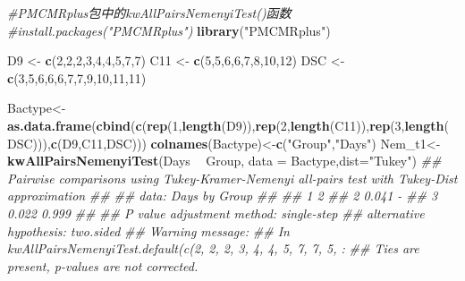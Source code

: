\documentclass[
]{article}
\newenvironment{Shaded}{\begin{snugshade}}{\end{snugshade}}
\newcommand{\CommentTok}[1]{\textcolor[rgb]{0.56,0.35,0.01}{\textit{#1}}}
\newcommand{\DataTypeTok}[1]{\textcolor[rgb]{0.13,0.29,0.53}{#1}}
\newcommand{\DecValTok}[1]{\textcolor[rgb]{0.00,0.00,0.81}{#1}}
\newcommand{\KeywordTok}[1]{\textcolor[rgb]{0.13,0.29,0.53}{\textbf{#1}}}
\newcommand{\NormalTok}[1]{#1}
\newcommand{\OperatorTok}[1]{\textcolor[rgb]{0.81,0.36,0.00}{\textbf{#1}}}
\newcommand{\StringTok}[1]{\textcolor[rgb]{0.31,0.60,0.02}{#1}}
\begin{document}
\begin{Shaded}
\begin{Highlighting}[]

\CommentTok{#PMCMRplus包中的kwAllPairsNemenyiTest()函数}
\CommentTok{#install.packages("PMCMRplus")}
\KeywordTok{library}\NormalTok{(}\StringTok{"PMCMRplus"}\NormalTok{)}

\NormalTok{D9 <-}\StringTok{ }\KeywordTok{c}\NormalTok{(}\DecValTok{2}\NormalTok{,}\DecValTok{2}\NormalTok{,}\DecValTok{2}\NormalTok{,}\DecValTok{3}\NormalTok{,}\DecValTok{4}\NormalTok{,}\DecValTok{4}\NormalTok{,}\DecValTok{5}\NormalTok{,}\DecValTok{7}\NormalTok{,}\DecValTok{7}\NormalTok{)}
\NormalTok{C11 <-}\StringTok{ }\KeywordTok{c}\NormalTok{(}\DecValTok{5}\NormalTok{,}\DecValTok{5}\NormalTok{,}\DecValTok{6}\NormalTok{,}\DecValTok{6}\NormalTok{,}\DecValTok{7}\NormalTok{,}\DecValTok{8}\NormalTok{,}\DecValTok{10}\NormalTok{,}\DecValTok{12}\NormalTok{)}
\NormalTok{DSC <-}\StringTok{ }\KeywordTok{c}\NormalTok{(}\DecValTok{3}\NormalTok{,}\DecValTok{5}\NormalTok{,}\DecValTok{6}\NormalTok{,}\DecValTok{6}\NormalTok{,}\DecValTok{6}\NormalTok{,}\DecValTok{7}\NormalTok{,}\DecValTok{7}\NormalTok{,}\DecValTok{9}\NormalTok{,}\DecValTok{10}\NormalTok{,}\DecValTok{11}\NormalTok{,}\DecValTok{11}\NormalTok{)}

\NormalTok{Bactype<-}\KeywordTok{as.data.frame}\NormalTok{(}\KeywordTok{cbind}\NormalTok{(}\KeywordTok{c}\NormalTok{(}\KeywordTok{rep}\NormalTok{(}\DecValTok{1}\NormalTok{,}\KeywordTok{length}\NormalTok{(D9)),}\KeywordTok{rep}\NormalTok{(}\DecValTok{2}\NormalTok{,}\KeywordTok{length}\NormalTok{(C11)),}\KeywordTok{rep}\NormalTok{(}\DecValTok{3}\NormalTok{,}\KeywordTok{length}\NormalTok{(DSC))),}\KeywordTok{c}\NormalTok{(D9,C11,DSC)))}
\KeywordTok{colnames}\NormalTok{(Bactype)<-}\KeywordTok{c}\NormalTok{(}\StringTok{"Group"}\NormalTok{,}\StringTok{"Days"}\NormalTok{)}
\NormalTok{Nem_t1<-}\KeywordTok{kwAllPairsNemenyiTest}\NormalTok{(Days }\OperatorTok{~}\StringTok{ }\NormalTok{Group, }\DataTypeTok{data =}\NormalTok{ Bactype,}\DataTypeTok{dist=}\StringTok{"Tukey"}\NormalTok{)}
\CommentTok{##  Pairwise comparisons using Tukey-Kramer-Nemenyi all-pairs test with Tukey-Dist approximation}
\CommentTok{## }
\CommentTok{## data: Days by Group}
\CommentTok{## }
\CommentTok{##   1     2    }
\CommentTok{## 2 0.041 -    }
\CommentTok{## 3 0.022 0.999}
\CommentTok{## }
\CommentTok{## P value adjustment method: single-step}
\CommentTok{## alternative hypothesis: two.sided}
\CommentTok{## Warning message:}
\CommentTok{## In kwAllPairsNemenyiTest.default(c(2, 2, 2, 3, 4, 4, 5, 7, 7, 5,  :}
\CommentTok{##   Ties are present, p-values are not corrected.}



\end{Highlighting}
\end{Shaded}
\end{document}
